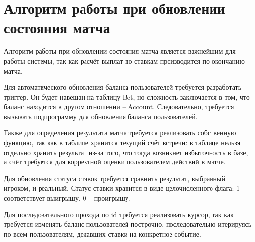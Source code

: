 \section{Алгоритм работы при обновлении состояния матча}
Алгоритм работы при обновлении состояния матча является важнейшим для работы системы, так как расчёт выплат по ставкам производится по окончанию матча.

Для автоматического обновления баланса пользователей требуется разработать триггер.
Он будет навешан на таблицу Bet, но сложность заключается в том, что баланс находится в другом отношении -- Account.
Следовательно, требуется вызывать подпрограмму для обновления баланса пользователей.

Также для определения результата матча требуется реализовать собственную функцию, так как в таблице хранится текущий счёт встречи: в таблице нельзя отдельно хранить результат из-за того, что тогда возникнет избыточность в базе, а счёт требуется для корректной оценки пользователем действий в матче. 

Для обновления статуса ставок требуется сравнить результат, выбранный игроком, и реальный. 
Статус ставки хранится в виде целочисленного флага: 1 соответствует выигрышу, 0 -- проигрышу.

Для последовательного прохода по id требуется реализовать курсор, так как требуется изменять баланс пользователей построчно, последовательно итерируясь по всем пользователям, делавших ставки на конкретное событие.

